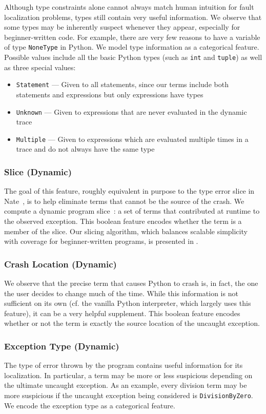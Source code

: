 \documentclass[conference]{IEEEtran}
\newcommand\lt[1]{{\lstinline|#1|}}
\begin{document}
Although type constraints alone cannot always match human intuition for
fault localization problems, types still contain very useful information.
We observe that some types may be inherently suspect whenever they appear,
especially for beginner-written code. For example, there are very few
reasons to have a variable of type \lt{NoneType} in Python. We model
type information as a categorical feature. Possible
values include all the basic Python types (such as \lt{int}
and \lt{tuple}) as well as three special values:
\begin{itemize}
    \item \lt{Statement} --- Given to all statements, since our terms
    include both statements and expressions but only expressions
    have types
    \item \lt{Unknown} --- Given to expressions that are never evaluated in the dynamic
    trace
    \item \lt{Multiple} --- Given to expressions which are evaluated multiple times in
    a trace and do not always have the same type
\end{itemize}

\subsubsection{Slice (Dynamic)}
The goal of this feature, roughly equivalent in purpose to the type error
slice in Nate~\cite{learning-to-blame}, is to help eliminate terms that
cannot be the source of the crash. We compute a dynamic program
slice~\cite{KOREL1988155}: a set of terms that contributed at runtime to
the observed exception. This boolean feature encodes whether the term
is a member of the slice. Our slicing algorithm, which balances scalable
simplicity with coverage for beginner-written programs, is presented in
.

\subsubsection{Crash Location (Dynamic)} We observe that the precise term that
causes Python to crash is, in fact, the one the user decides to change
much of the time. While this information is not sufficient on its own
(cf. the vanilla Python interpreter, which largely uses this feature),
it can be a very helpful supplement. This boolean feature encodes whether
or not the term is exactly the source location of the uncaught exception.

\subsubsection{Exception Type (Dynamic)} The type of error thrown by the program
contains useful information for its localization. In particular, a term may be
more or less suspicious depending on the ultimate uncaught exception. As an
example, every division term may be more suspicious if the uncaught exception
being considered is \lt{DivisionByZero}. We encode the exception type as
a categorical feature.
\end{document}
